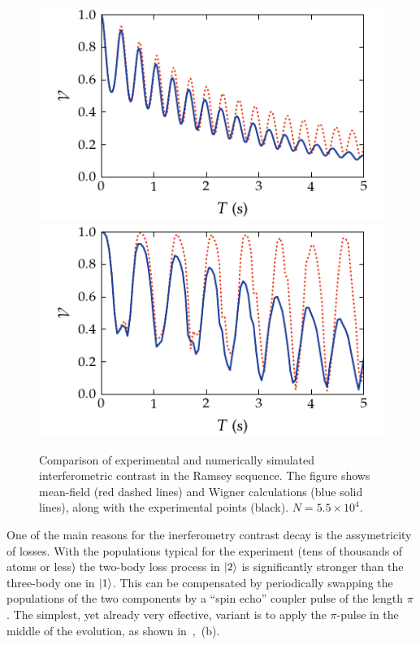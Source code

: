 \begin{figure}
    \centerline{%
    \includegraphics{figures_generated/phase_noise/ramsey_visibility_long.pdf}%
    \includegraphics{figures_generated/phase_noise/echo_visibility_long.pdf}}

    \caption{
    Comparison of experimental and numerically simulated interferometric contrast in the Ramsey sequence.
    The figure shows mean-field (red dashed lines) and Wigner calculations (blue solid lines), along with the experimental points (black).
    $N = 5.5 \times 10^4$.}

    \label{fig:bec-noise:phase-noise:ramsey-visibility-long}
\end{figure}

One of the main reasons for the inerferometry contrast decay is the assymetricity of losses.
With the populations typical for the experiment (tens of thousands of atoms or less) the two-body loss process in $\mbox{\ensuremath{\vert 2 \rangle}}$ is significantly stronger than the three-body one in $\mbox{\ensuremath{\vert 1 \rangle}}$.
This can be compensated by periodically swapping the populations of the two components by a ``spin echo'' coupler pulse of the length $\pi$.
The simplest, yet already very effective, variant is to apply the $\pi$-pulse in the middle of the evolution, as shown in~,~(b).

